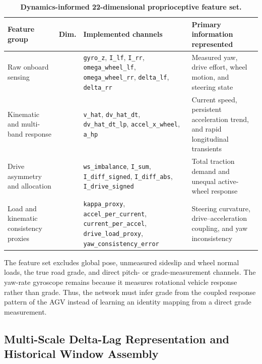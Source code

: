 \documentclass{ieeeaccess}
\begin{document}
\begin{table}[!tbp]
\centering
\caption{\textbf{Dynamics-informed 22-dimensional proprioceptive feature set.}}
\label{tab:feature_contract_22d}
\setlength{\tabcolsep}{3pt}
\begin{tabular}{|>{\raggedright\arraybackslash}p{}|>{\centering\arraybackslash}p{}|>{\raggedright\arraybackslash}p{}|>{\raggedright\arraybackslash}p{}|}
\hline
Feature group & Dim. & Implemented channels & Primary information represented \\
\hline
Raw onboard sensing & 7 & \texttt{gyro\_z}, \texttt{I\_lf}, \texttt{I\_rr}, \texttt{omega\_wheel\_lf}, \texttt{omega\_wheel\_rr}, \texttt{delta\_lf}, \texttt{delta\_rr} & Measured yaw, drive effort, wheel motion, and steering state \\
Kinematic and multi-band response & 5 & \texttt{v\_hat}, \texttt{dv\_hat\_dt}, \texttt{dv\_hat\_dt\_lp}, \texttt{accel\_x\_wheel}, \texttt{a\_hp} & Current speed, persistent acceleration trend, and rapid longitudinal transients \\
Drive asymmetry and allocation & 5 & \texttt{ws\_imbalance}, \texttt{I\_sum}, \texttt{I\_diff\_signed}, \texttt{I\_diff\_abs}, \texttt{I\_drive\_signed} & Total traction demand and unequal active-wheel response \\
Load and kinematic consistency proxies & 5 & \texttt{kappa\_proxy}, \texttt{accel\_per\_current}, \texttt{current\_per\_accel}, \texttt{drive\_load\_proxy}, \texttt{yaw\_consistency\_error} & Steering curvature, drive--acceleration coupling, and yaw inconsistency \\
\hline
\end{tabular}
\end{table}

The feature set excludes global pose, unmeasured sideslip and wheel normal loads, the true road grade, and direct pitch- or grade-measurement channels. The yaw-rate gyroscope remains because it measures rotational vehicle response rather than grade. Thus, the network must infer grade from the coupled response pattern of the AGV instead of learning an identity mapping from a direct grade measurement.

\subsection{Multi-Scale Delta-Lag Representation and Historical Window Assembly}
\end{document}
